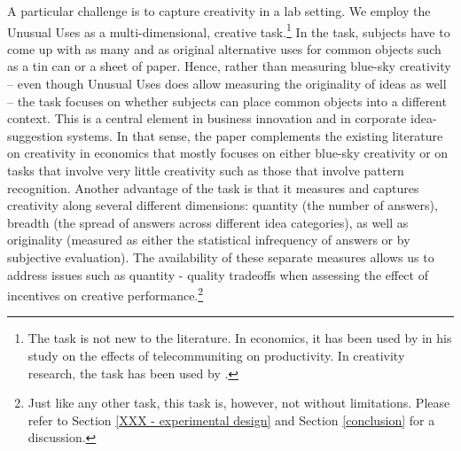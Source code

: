 A particular challenge is to capture creativity in a lab setting. 
We employ the Unusual Uses as a multi-dimensional, creative task.\footnote{The task is not new 
to the literature. In economics, it has 
 been used by \cite{dutcherJEBO12} in his study on the effects of telecommuniting on productivity. In creativity research, the 
task has been used by \cite{Shalley97}. }  In the task, 
subjects have to come up with as many and as original alternative uses for common objects such as a tin can or a 
sheet of paper. Hence, rather than measuring blue-sky creativity -- even though Unusual Uses 
does allow measuring the originality of ideas as well -- the task focuses on whether subjects can place 
common objects into a different context. This is a central element in business innovation and in 
corporate idea-suggestion systems\citep{woodman93}. In that sense, the paper complements the existing literature on creativity in economics that mostly 
focuses on either blue-sky creativity or on tasks that involve very little creativity 
such as those that involve pattern recognition. Another advantage of the task is that it measures and 
captures creativity along several different dimensions: quantity (the number of answers), 
breadth (the spread of answers across different idea categories), as well as originality
 (measured as either the statistical infrequency of answers or by subjective evaluation). 
The availability of these separate measures allows us to address issues such as quantity 
- quality tradeoffs when assessing the effect of incentives on creative performance.\footnote{Just like any other task, this task is, however, not without limitations. Please refer to Section \ref{XXX - experimental design} and Section \ref{conclusion} for a discussion.} 












